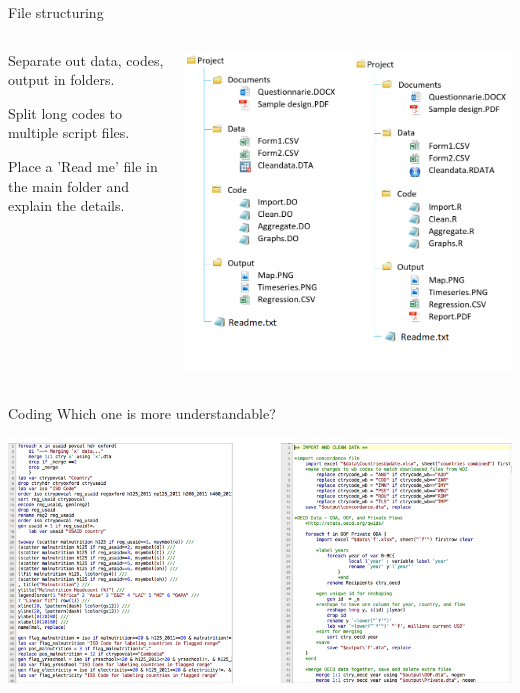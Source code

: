 \documentclass[handout]{beamer}
\begin{document}
\begin{frame}{File structuring}
\begin{columns}
	\begin{column}{.3\textwidth}
Separate out data, codes, output in folders.\bigskip

Split long codes to multiple script files.\bigskip

Place a 'Read me' file in the main folder and explain the details.
	\end{column}
	\begin{column}{.7\textwidth}
	\includegraphics[width=\textwidth]{./Figures/filestructuring}
	\end{column}
\end{columns}
\end{frame}

\begin{frame}{Coding}
Which one is more understandable?\bigskip

	\includegraphics[width=\textwidth]{./Figures/coding}
\end{frame}
\end{document}
